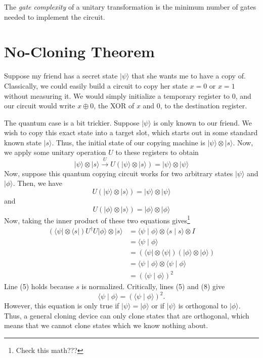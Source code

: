 \documentclass[12pt,twoside]{reedthesis}
\theoremstyle{definition}
\newcommand{\ket}[1]{\ensuremath{\lvert #1\rangle}\xspace}
\newcommand{\bra}[1]{\ensuremath{\langle #1\vert}\xspace}
\newcommand{\inner}[2]{\ensuremath{\langle #1 \mid #2 \rangle}\xspace}
\begin{document}
The \textit{gate complexity} of a unitary transformation is the minimum number of gates needed to implement the circuit. 

\section{No-Cloning Theorem}

Suppose my friend has a secret state \ket{\psi} that she wants me to have a copy of.  Classically, we could easily build a circuit to copy her state $x = 0$ or $x = 1$ without measuring it. We would simply initialize a temporary register to 0, and our circuit would write $x \oplus 0$, the XOR of $x$ and 0, to the destination register. 

The quantum case is a bit trickier. Suppose \ket{\psi} is only known to our friend. We wish to copy this exact state into a target slot, which starts out in some standard known state \ket{s}. Thus, the initial state of our copying machine is $\ket{\psi} \otimes \ket{s}$. Now, we apply some unitary operation $U$ to these registers to obtain
\begin{equation}
\ket{\psi} \otimes \ket{s} \xrightarrow{U} U(\ket{\psi} \otimes \ket{s}) = \ket{\psi} \otimes \ket{\psi}
\end{equation}
Now, suppose this quantum copying circuit works for two arbitrary states \ket{\psi} and \ket{\phi}. Then, we have
\begin{equation}
U(\ket{\psi} \otimes \ket{s}) = \ket{\psi} \otimes \ket{\psi}
\end{equation}
and
\begin{equation}
U(\ket{\phi} \otimes \ket{s}) = \ket{\phi} \otimes \ket{\phi}
\end{equation}
Now, taking the inner product of these two equations gives\footnote{Check this math???} 
\begin{align}
(\bra{\psi} \otimes \bra{s})U^{\dagger}U \ket{\phi} \otimes \ket{s}
& = \inner{\psi}{\phi} \otimes \inner{s}{s} \otimes I \\
 & = \inner{\psi}{\phi}\\
& = (\bra{\psi}\otimes \bra{\psi})(\ket{\phi}\otimes \ket{\phi}) \\
& = \inner{\psi}{\phi} \otimes \inner{\psi}{\phi} \\
& = (\inner{\psi}{\phi})^2
\end{align}
Line (5) holds because $s$ is normalized. Critically, lines (5) and (8) give
\begin{equation*}
 \inner{\psi}{\phi} = (\inner{\psi}{\phi})^2.
\end{equation*}
However, this equation is only true if $\ket{\psi} = \ket{\phi}$ or if $\ket{\psi}$ is orthogonal to $\ket{\phi}$. Thus, a general cloning device can only clone states that are orthogonal, which means that we cannot clone states which we know nothing about. 
\end{document}
